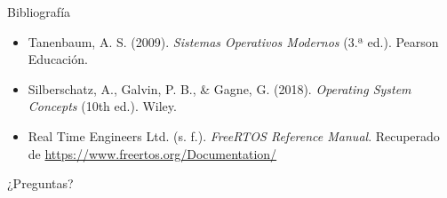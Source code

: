 \documentclass[10pt, aspectratio=169]{beamer} %
\begin{document}
\begin{frame}{Bibliografía}
\begin{itemize}
    \item Tanenbaum, A. S. (2009). \textit{Sistemas Operativos Modernos} (3.ª ed.). Pearson Educación.
    \item Silberschatz, A., Galvin, P. B., \& Gagne, G. (2018). \textit{Operating System Concepts} (10th ed.). Wiley.
    \item Real Time Engineers Ltd. (s. f.). \textit{FreeRTOS Reference Manual}. Recuperado de \url{https://www.freertos.org/Documentation/}
\end{itemize}
\end{frame}

\begin{frame}
    \centering
    \Huge \textcolor{UCUBlue}{¿Preguntas?}
    \vfill
    \normalsize \insertauthor \\ 
    \vspace{5mm}
    \insertinstitute
\end{frame}
\end{document}
